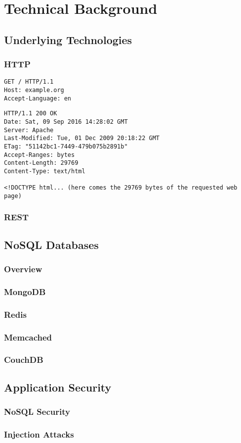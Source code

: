 \chapter{Technical Background}
\label{cha:technicalBackground}

\section{Underlying Technologies}
\subsection{HTTP}

\cite{Berners-Lee1996}
\cite{Fielding:1999}

\begin{lstlisting}[caption={HTTP GET request}, label={lst:http_request}]
GET / HTTP/1.1
Host: example.org
Accept-Language: en
\end{lstlisting}

\begin{lstlisting}[caption={HTTP response}, label={lst:http_response}]
HTTP/1.1 200 OK
Date: Sat, 09 Sep 2016 14:28:02 GMT
Server: Apache
Last-Modified: Tue, 01 Dec 2009 20:18:22 GMT
ETag: "51142bc1-7449-479b075b2891b"
Accept-Ranges: bytes
Content-Length: 29769
Content-Type: text/html

<!DOCTYPE html... (here comes the 29769 bytes of the requested web page)
\end{lstlisting}

\subsection{REST}
\cite{Fielding:2000}

\section{NoSQL Databases}
\subsection{Overview}
\subsection{MongoDB}
\subsection{Redis}
\subsection{Memcached}
\subsection{CouchDB}

\section{Application Security}
\subsection{NoSQL Security}
\subsection{Injection Attacks}